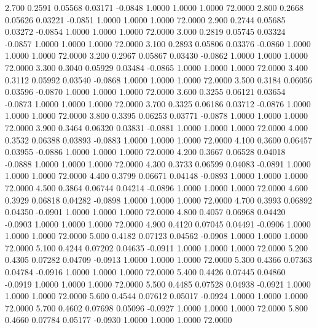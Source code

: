    2.700   0.2591   0.05568   0.03171  -0.0848   1.0000   1.0000   1.0000  72.0000
   2.800   0.2668   0.05626   0.03221  -0.0851   1.0000   1.0000   1.0000  72.0000
   2.900   0.2744   0.05685   0.03272  -0.0854   1.0000   1.0000   1.0000  72.0000
   3.000   0.2819   0.05745   0.03324  -0.0857   1.0000   1.0000   1.0000  72.0000
   3.100   0.2893   0.05806   0.03376  -0.0860   1.0000   1.0000   1.0000  72.0000
   3.200   0.2967   0.05867   0.03430  -0.0862   1.0000   1.0000   1.0000  72.0000
   3.300   0.3040   0.05929   0.03484  -0.0865   1.0000   1.0000   1.0000  72.0000
   3.400   0.3112   0.05992   0.03540  -0.0868   1.0000   1.0000   1.0000  72.0000
   3.500   0.3184   0.06056   0.03596  -0.0870   1.0000   1.0000   1.0000  72.0000
   3.600   0.3255   0.06121   0.03654  -0.0873   1.0000   1.0000   1.0000  72.0000
   3.700   0.3325   0.06186   0.03712  -0.0876   1.0000   1.0000   1.0000  72.0000
   3.800   0.3395   0.06253   0.03771  -0.0878   1.0000   1.0000   1.0000  72.0000
   3.900   0.3464   0.06320   0.03831  -0.0881   1.0000   1.0000   1.0000  72.0000
   4.000   0.3532   0.06388   0.03893  -0.0883   1.0000   1.0000   1.0000  72.0000
   4.100   0.3600   0.06457   0.03955  -0.0886   1.0000   1.0000   1.0000  72.0000
   4.200   0.3667   0.06528   0.04018  -0.0888   1.0000   1.0000   1.0000  72.0000
   4.300   0.3733   0.06599   0.04083  -0.0891   1.0000   1.0000   1.0000  72.0000
   4.400   0.3799   0.06671   0.04148  -0.0893   1.0000   1.0000   1.0000  72.0000
   4.500   0.3864   0.06744   0.04214  -0.0896   1.0000   1.0000   1.0000  72.0000
   4.600   0.3929   0.06818   0.04282  -0.0898   1.0000   1.0000   1.0000  72.0000
   4.700   0.3993   0.06892   0.04350  -0.0901   1.0000   1.0000   1.0000  72.0000
   4.800   0.4057   0.06968   0.04420  -0.0903   1.0000   1.0000   1.0000  72.0000
   4.900   0.4120   0.07045   0.04491  -0.0906   1.0000   1.0000   1.0000  72.0000
   5.000   0.4182   0.07123   0.04562  -0.0908   1.0000   1.0000   1.0000  72.0000
   5.100   0.4244   0.07202   0.04635  -0.0911   1.0000   1.0000   1.0000  72.0000
   5.200   0.4305   0.07282   0.04709  -0.0913   1.0000   1.0000   1.0000  72.0000
   5.300   0.4366   0.07363   0.04784  -0.0916   1.0000   1.0000   1.0000  72.0000
   5.400   0.4426   0.07445   0.04860  -0.0919   1.0000   1.0000   1.0000  72.0000
   5.500   0.4485   0.07528   0.04938  -0.0921   1.0000   1.0000   1.0000  72.0000
   5.600   0.4544   0.07612   0.05017  -0.0924   1.0000   1.0000   1.0000  72.0000
   5.700   0.4602   0.07698   0.05096  -0.0927   1.0000   1.0000   1.0000  72.0000
   5.800   0.4660   0.07784   0.05177  -0.0930   1.0000   1.0000   1.0000  72.0000
